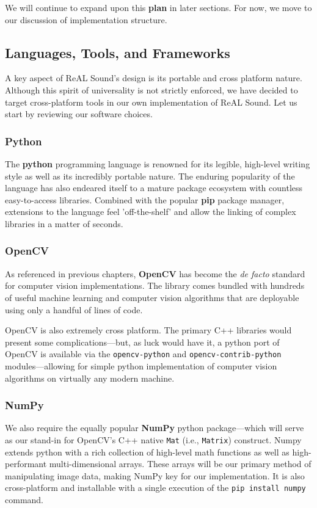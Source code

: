 \documentclass{report}
\newcommand{\rs}{ReAL Sound\xspace}
\newcommand{\state}[1]{\textbf{#1}}
\newcommand{\tech}[1]{\textbf{#1}}
\begin{document}
We will continue to expand upon this \state{plan} in later sections. For now, we move to our discussion of implementation structure.

\subsection{Languages, Tools, and Frameworks}

A key aspect of \rs's design is its portable and cross platform nature. Although this spirit of universality is not strictly enforced, we have decided to target cross-platform tools in our own implementation of \rs. Let us start by reviewing our software choices. 
\subsubsection{Python}

The \tech{python} programming language is renowned for its legible, high-level writing style as well as its incredibly portable nature. The enduring popularity of the language has also endeared itself to a mature package ecosystem with countless easy-to-access libraries. Combined with the popular \tech{pip} package manager, extensions to the language feel 'off-the-shelf' and allow the linking of complex libraries in a matter of seconds.

\subsubsection{OpenCV}
As referenced in previous chapters, \tech{OpenCV} has become the \emph{de facto} standard for computer vision implementations. The library comes bundled with hundreds of useful machine learning and computer vision algorithms that are deployable using only a handful of lines of code.

OpenCV is also extremely cross platform. The primary C++ libraries would present some complications---but, as luck would have it, a python port of OpenCV is available via the \texttt{opencv-python} and \texttt{opencv-contrib-python} modules---allowing for simple python implementation of computer vision algorithms on virtually any modern machine. 

\subsubsection{NumPy}
We also require the equally popular \tech{NumPy} python package---which will serve as our stand-in for OpenCV's C++ native \texttt{Mat} (i.e., \texttt{Matrix}) construct. Numpy extends python with a rich collection of high-level math functions as well as high-performant multi-dimensional arrays. These arrays will be our primary method of manipulating image data, making NumPy key for our implementation. It is also cross-platform and installable with a single execution of the \texttt{pip install numpy} command.
\end{document}
